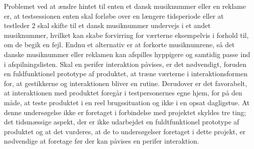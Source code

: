 Problemet ved at ændre hintet til enten et dansk musiknummer eller en reklame er, at testsessionen enten skal forløbe over en længere tidsperiode eller at testleder 2 skal skifte til et dansk musiknummer undervejs i et andet musiknummer, hvilket kan skabe forvirring for værterne eksempelvis i forhold til, om de begik en fejl. Endnu et alternativ er at forkorte musiknumrene, så det danske musiknummer eller reklamen kan afspilles hyppigere og samtidig passe ind i afspilningslisten.\blankline
%
Skal en perifer interaktion påvises, er det nødvendigt, foruden en fuldfunktionel prototype af produktet, at træne værterne i interaktionsformen for, at gestikkerne og interaktionen bliver en rutine. Derudover er det favorabelt, at interaktionen med produktet foregår i testpersonernes egne hjem, for på den måde, at teste produktet i en reel brugssituation og ikke i en opsat dagligstue. At denne undersøgelse ikke er foretaget i forbindelse med projektet skyldes tre ting; det tidsmæssige aspekt, der er ikke udarbejdet en fuldtfunktionel prototype af produktet og at det vurderes, at de to undersøgelser foretaget i dette projekt, er nødvendige at foretage før der kan påvises en perifer interaktion.     
% 